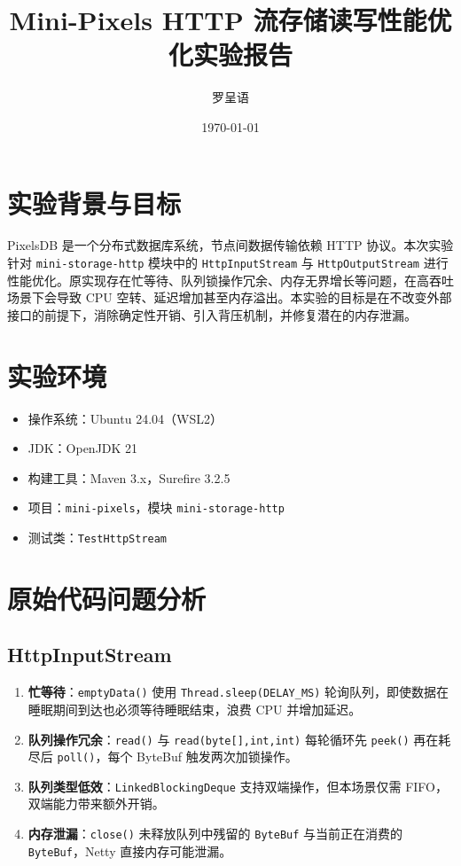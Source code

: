 \documentclass[11pt,a4paper]{article}
\title{Mini-Pixels HTTP 流存储读写性能优化实验报告}
\author{罗呈语}
\date{\today}
\begin{document}
\maketitle

\section{实验背景与目标}
PixelsDB 是一个分布式数据库系统，节点间数据传输依赖 HTTP 协议。本次实验针对 \texttt{mini-storage-http} 模块中的 \texttt{HttpInputStream} 与 \texttt{HttpOutputStream} 进行性能优化。原实现存在忙等待、队列锁操作冗余、内存无界增长等问题，在高吞吐场景下会导致 CPU 空转、延迟增加甚至内存溢出。本实验的目标是在不改变外部接口的前提下，消除确定性开销、引入背压机制，并修复潜在的内存泄漏。

\section{实验环境}
\begin{itemize}
    \item 操作系统：Ubuntu 24.04（WSL2）
    \item JDK：OpenJDK 21
    \item 构建工具：Maven 3.x，Surefire 3.2.5
    \item 项目：\texttt{mini-pixels}，模块 \texttt{mini-storage-http}
    \item 测试类：\texttt{TestHttpStream}
\end{itemize}

\section{原始代码问题分析}

\subsection{HttpInputStream}
\begin{enumerate}
    \item \textbf{忙等待}：\texttt{emptyData()} 使用 \texttt{Thread.sleep(DELAY\_MS)} 轮询队列，即使数据在睡眠期间到达也必须等待睡眠结束，浪费 CPU 并增加延迟。
    \item \textbf{队列操作冗余}：\texttt{read()} 与 \texttt{read(byte[],int,int)} 每轮循环先 \texttt{peek()} 再在耗尽后 \texttt{poll()}，每个 ByteBuf 触发两次加锁操作。
    \item \textbf{队列类型低效}：\texttt{LinkedBlockingDeque} 支持双端操作，但本场景仅需 FIFO，双端能力带来额外开销。
    \item \textbf{内存泄漏}：\texttt{close()} 未释放队列中残留的 \texttt{ByteBuf} 与当前正在消费的 \texttt{ByteBuf}，Netty 直接内存可能泄漏。
\end{enumerate}
\end{document}
